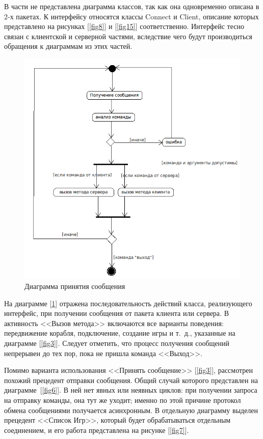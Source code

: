 В части не представлена диаграмма классов, так как она одновременно описана в 2-х пакетах. К интерфейсу относятся классы Connect и Client, описание которых представлено на рисунках [\ref{fig8}] и [\ref{fig15}] соответственно. Интерфейс тесно связан с клиентской и серверной частями, вследствие чего будут производиться обращения к диаграммам из этих частей.

\begin{figure}[htp]
\centering
\includegraphics[width=12cm]{images/activity.png}
\caption{Диаграмма принятия сообщения}
\label{fig5}
\end{figure}

На диаграмме [\ref{fig5}] отражена последовательность действий класса, реализующего интерфейс, при получении сообщения от пакета клиента или сервера. В активность <<Вызов метода>> включаются все варианты поведения: передвижение корабля, подключение, создание игры и т.~д., указанные на диаграмме  [\ref{fig3}]. Следует отметить, что процесс получения сообщений непрерывен до тех пор, пока не пришла команда <<Выход>>.

Помимо варианта использования <<Принять сообщение>> [\ref{fig3}], рассмотрен похожий прецедент отправки сообщения. Общий случай которого представлен  на диаграмме~[\ref{fig6}]. В ней нет явных или неявных циклов: при получении  запроса на отправку команды, она тут же уходит; именно по этой причине протокол обмена сообщениями получается асинхронным. В отдельную диаграмму выделен прецедент <<Список Игр>>, который будет обрабатываться отдельным соединением, и его работа представлена на рисунке [\ref{fig7}].
 
